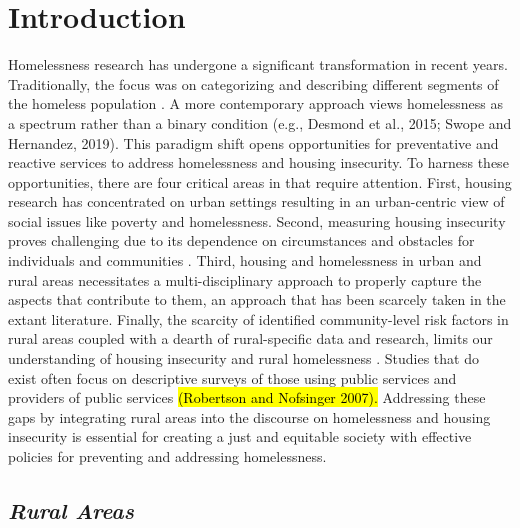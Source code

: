 \chapter{Introduction} 

Homelessness research has undergone a significant transformation in recent years. Traditionally, the focus was on categorizing and describing different segments of the homeless population \citep{lee_homelessness_2021}. A more contemporary approach views homelessness as a spectrum rather than a binary condition (e.g., Desmond et al., 2015; Swope and Hernandez, 2019). This paradigm shift opens opportunities for preventative and reactive services to address homelessness and housing insecurity. To harness these opportunities, there are four critical areas in that require attention. First, housing research has concentrated on urban settings resulting in an urban-centric view of social issues like poverty and homelessness. Second, measuring housing insecurity proves challenging due to its dependence on circumstances and obstacles for individuals and communities \citep{leifheit_building_2022}. Third, housing and homelessness in urban and rural areas necessitates a multi-disciplinary approach to properly capture the aspects that contribute to them, an approach that has been scarcely taken in the extant literature.  Finally, the scarcity of identified community-level risk factors in rural areas coupled with a dearth of rural-specific data and research, limits our understanding of housing insecurity and rural homelessness \citep{gleason_using_2021}. Studies that do exist often focus on descriptive surveys of those using public services and providers of public services \hl{(Robertson and Nofsinger 2007). }Addressing these gaps by integrating rural areas into the discourse on homelessness and housing insecurity is essential for creating a just and equitable society with effective policies for preventing and addressing homelessness\citep{oregan_how_2021}.

\section{\textit{Rural Areas}}

